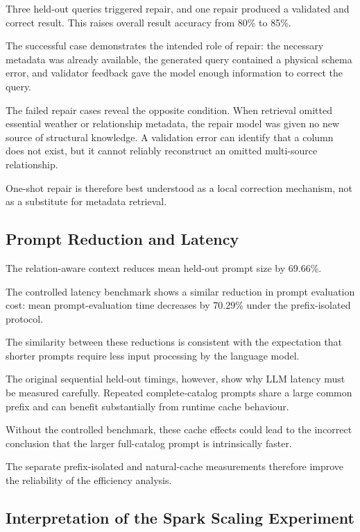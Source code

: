 Three held-out queries triggered repair, and one repair produced a validated
and correct result. This raises overall result accuracy from 80\% to 85\%.

The successful case demonstrates the intended role of repair: the necessary
metadata was already available, the generated query contained a physical
schema error, and validator feedback gave the model enough information to
correct the query.

The failed repair cases reveal the opposite condition. When retrieval omitted
essential weather or relationship metadata, the repair model was given no new
source of structural knowledge. A validation error can identify that a column
does not exist, but it cannot reliably reconstruct an omitted multi-source
relationship.

One-shot repair is therefore best understood as a local correction mechanism,
not as a substitute for metadata retrieval.


\subsection{Prompt Reduction and Latency}

The relation-aware context reduces mean held-out prompt size by 69.66\%.

The controlled latency benchmark shows a similar reduction in prompt
evaluation cost: mean prompt-evaluation time decreases by 70.29\% under the
prefix-isolated protocol.

The similarity between these reductions is consistent with the expectation
that shorter prompts require less input processing by the language model.

The original sequential held-out timings, however, show why LLM latency must
be measured carefully. Repeated complete-catalog prompts share a large common
prefix and can benefit substantially from runtime cache behaviour.

Without the controlled benchmark, these cache effects could lead to the
incorrect conclusion that the larger full-catalog prompt is intrinsically
faster.

The separate prefix-isolated and natural-cache measurements therefore improve
the reliability of the efficiency analysis.


\subsection{Interpretation of the Spark Scaling Experiment}

